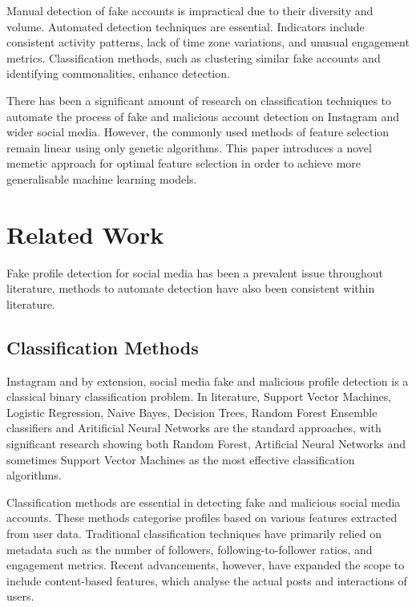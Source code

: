 \documentclass[conference]{IEEEtran}
\begin{document}
Manual detection of fake accounts is impractical due to their diversity and volume. Automated detection techniques are essential. Indicators include consistent activity patterns, lack of time zone variations, and unusual engagement metrics. Classification methods, such as clustering similar fake accounts and identifying commonalities, enhance detection.

There has been a significant amount of research on classification techniques to automate the process of fake and malicious account detection on Instagram and wider social media\cite{EkosputraEtAl2021,EzarfelixEtAl2022}. However, the commonly used methods of feature selection remain linear using only genetic algorithms. This paper introduces a novel memetic approach for optimal feature selection in order to achieve more generalisable machine learning models.

\section{Related Work}\label{sec:related-work}

Fake profile detection for social media has been a prevalent issue throughout literature, methods to automate detection have also been consistent within literature.

\subsection{Classification Methods}

Instagram and by extension, social media fake and malicious profile detection is a classical binary classification problem. In literature, Support Vector Machines, Logistic Regression, Naive Bayes, Decision Trees, Random Forest Ensemble classifiers and Aritificial Neural Networks are the standard approaches, with significant research showing both Random Forest, Artificial Neural Networks and sometimes Support Vector Machines as the most effective classification algorithms\cite{AkyonKalfaoglu2019,EkosputraEtAl2021}.

Classification methods are essential in detecting fake and malicious social media accounts. These methods categorise profiles based on various features extracted from user data. Traditional classification techniques have primarily relied on metadata such as the number of followers, following-to-follower ratios, and engagement metrics. Recent advancements, however, have expanded the scope to include content-based features, which analyse the actual posts and interactions of users.
\end{document}
